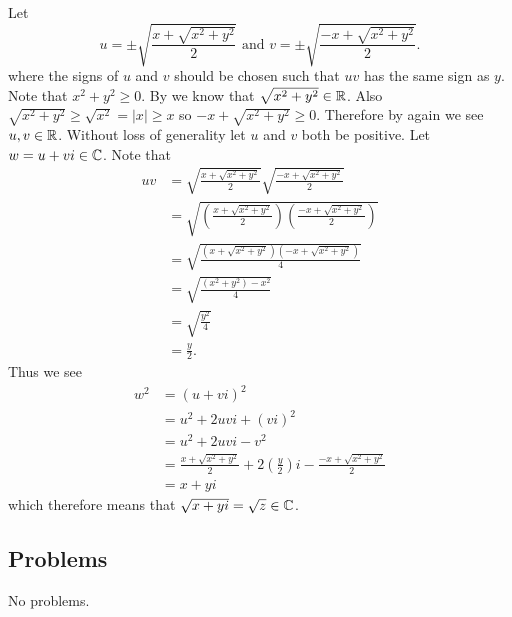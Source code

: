 \begin{questions}
    \item Let
    \[
        u = \pm\sqrt{\frac{x + \sqrt{x^2+y^2}}{2}} \text{ and } v = \pm\sqrt{\frac{-x + \sqrt{x^2+y^2}}{2}}.
    \]
    where the signs of $u$ and $v$ should be chosen such that $uv$ has the same sign as $y$. Note that $x^2 + y^2 \geq 0$. By  we know that $\sqrt{x^2+y^2} \in \mathbb{R}$. Also $\sqrt{x^2+y^2} \geq \sqrt{x^2} = |x| \geq x$ so $-x + \sqrt{x^2+y^2} \geq 0$. Therefore by  again we see $u, v \in \mathbb{R}$. Without loss of generality let $u$ and $v$ both be positive. Let $w = u + vi \in \mathbb{C}$. Note that
    \begin{align*}
        uv &= \sqrt{\frac{x + \sqrt{x^2+y^2}}{2}}\sqrt{\frac{-x + \sqrt{x^2+y^2}}{2}}\\
        &= \sqrt{\left(\frac{x + \sqrt{x^2+y^2}}{2}\right)\left(\frac{-x + \sqrt{x^2+y^2}}{2}\right)}\\
        &= \sqrt{\frac{\left(x + \sqrt{x^2+y^2}\right)\left(-x + \sqrt{x^2+y^2}\right)}{4}}\\
        &= \sqrt{\frac{(x^2+y^2)-x^2}{4}}\\
        &= \sqrt{\frac{y^2}4}\\
        &= \frac y2.
    \end{align*}
    Thus we see
    \begin{align*}
        w^2 &= (u+vi)^2\\
        &= u^2 + 2uvi + (vi)^2\\
        &= u^2 + 2uvi - v^2\\
        &= \frac{x + \sqrt{x^2+y^2}}{2} + 2\left(\frac y2\right)i - \frac{-x + \sqrt{x^2+y^2}}{2}\\
        &= x + yi
    \end{align*}
    which therefore means that $\sqrt{x+yi} = \sqrt{z} \in \mathbb{C}$.
\end{questions}

\subsection*{Problems}
No problems.
